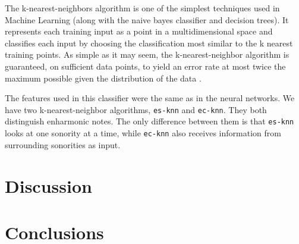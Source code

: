 \documentclass{article}
\begin{document}
The k-nearest-neighbors algorithm is one of the simplest techniques
used in Machine Learning (along with the naive bayes classifier and
decision trees). It represents each training input as a point in a
multidimensional space and classifies each input by choosing the
classification most similar to the k nearest training points. As
simple as it may seem, the k-nearest-neighbor algorithm is guaranteed,
on sufficient data points, to yield an error rate at most twice the
maximum possible given the distribution of the data
\cite{fix.ea:important}.

The features used in this classifier were the same as in the neural
networks. We have two k-nearest-neighbor algorithms, \texttt{es-knn}
and \texttt{ec-knn}. They both distinguish enharmonic notes. The only
difference between them is that \texttt{es-knn} looks at one sonority
at a time, while \texttt{ec-knn} also receives information from
surrounding sonorities as input.

\section{Discussion}
\label{sec:discussion}



\section{Conclusions}
\label{sec:conclusions}




\end{document}
